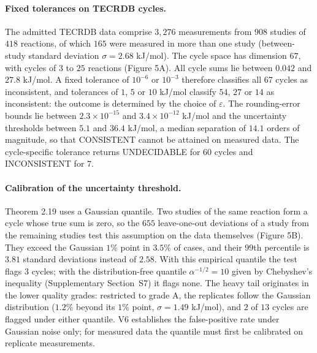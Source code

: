 \documentclass[11pt,a4paper]{article}
\theoremstyle{pstyle}
\theoremstyle{definition}
\theoremstyle{remark}
\newcommand{\eps}{\varepsilon}
\begin{document}
\paragraph{Fixed tolerances on TECRDB cycles.} The admitted TECRDB data
comprise $3{,}276$ measurements from $908$ studies of $418$ reactions,
of which $165$ were measured in more than one study (between-study
standard deviation $\sigma=2.68$ kJ/mol). The cycle space has dimension
$67$, with cycles of $3$ to $25$ reactions (Figure 5A).
All cycle sums lie between $0.042$ and $27.8$ kJ/mol. A fixed
tolerance of $10^{-6}$ or $10^{-3}$ therefore classifies all $67$ cycles
as inconsistent, and tolerances of $1$, $5$ or $10$ kJ/mol classify
$54$, $27$ or $14$ as inconsistent: the outcome is determined by the
choice of $\eps$. The rounding-error bounds lie between
$2.3\times10^{-15}$ and $3.4\times10^{-12}$ kJ/mol and the uncertainty
thresholds between $5.1$ and $36.4$ kJ/mol, a median separation of
$14.1$ orders of magnitude, so that \textsf{CONSISTENT} cannot be
attained on measured data. The cycle-specific tolerance returns
\textsf{UNDECIDABLE} for $60$ cycles and \textsf{INCONSISTENT} for $7$.

\paragraph{Calibration of the uncertainty threshold.}
Theorem 2.19 uses a Gaussian quantile. Two studies of the same
reaction form a cycle whose true sum is zero, so the $655$ leave-one-out
deviations of a study from the remaining studies test this assumption
on the data themselves (Figure 5B). They exceed the
Gaussian $1\%$ point in $3.5\%$ of cases, and their $99$th percentile is
$3.81$ standard deviations instead of $2.58$. With this empirical
quantile the test flags $3$ cycles; with the distribution-free quantile
$\alpha^{-1/2}=10$ given by Chebyshev's inequality (Supplementary
Section~S7) it flags none. The heavy tail originates in the lower
quality grades: restricted to grade A, the replicates follow the
Gaussian distribution ($1.2\%$ beyond its $1\%$ point, $\sigma=1.49$
kJ/mol), and $2$ of $13$ cycles are flagged under either quantile. V6
establishes the false-positive rate under Gaussian noise only; for
measured data the quantile must first be calibrated on replicate
measurements.
\end{document}
